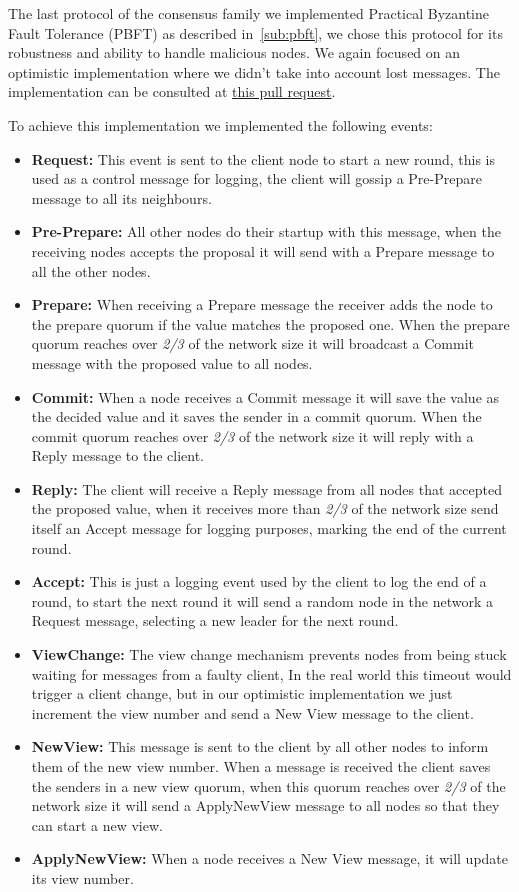 The last protocol of the consensus family we implemented Practical Byzantine Fault Tolerance (PBFT) as described
in~\ref{sub:pbft}, we chose this protocol for its robustness and ability to handle malicious nodes.
We again focused on an optimistic implementation where we didn't take into account lost messages.
The implementation can be consulted at \href{https://github.com/RMLoureiro/MOBS/pull/6}{this pull request}.

To achieve this implementation we implemented the following events:
\begin{itemize}
	\item \textbf{Request: } This event is sent to the client node to start a new round, this is used
	as a control message for logging, the client will gossip a Pre-Prepare message to all its neighbours.
	\item \textbf{Pre-Prepare: } All other nodes do their startup with this message,
	when the receiving nodes accepts the proposal it will send with a Prepare message to all the other nodes.
	\item \textbf{Prepare: } When receiving a Prepare message  the receiver
	adds the node to the prepare quorum if the value matches the proposed one.
	When the prepare quorum reaches over \textit{2/3} of the network size it will
	broadcast a Commit message with the proposed value to all nodes.
	\item \textbf{Commit: } When a node receives a Commit message it will save the value as the decided value and it saves
	the sender in a commit quorum. When the commit quorum reaches over \textit{2/3} of the network size it will
	reply with a Reply message to the client.
	\item \textbf{Reply: } The client will receive a Reply message from all nodes that accepted the proposed value,
	when it receives more than \textit{2/3} of the network size send itself an Accept message for logging purposes, marking the end of
	the current round.
	\item \textbf{Accept: } This is just a logging event used by the client to log the end of a round, to start the next round
	it will send a random node in the network a Request message, selecting a new leader for the next round.
	\item \textbf{ViewChange: }	The view change mechanism prevents nodes from being stuck waiting for messages from a faulty client,
  In the real world this timeout would trigger a client change, but in our optimistic implementation we just increment the view number
	and send a New View message to the client.
	\item \textbf{NewView: } This message is sent to the client by all other nodes to inform them of the new view number. When a message
	is received the client saves the senders in a new view quorum, when this quorum reaches over \textit{2/3} of the network size
	it will send a ApplyNewView message to all nodes so that they can start a new view.
	\item \textbf{ApplyNewView: } When a node receives a New View message, it will update its view number.
\end{itemize}

